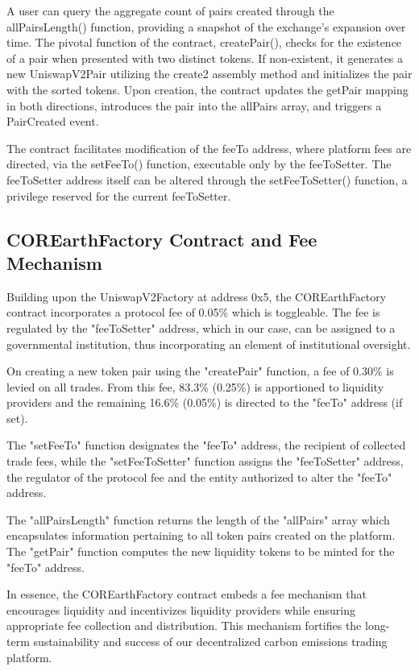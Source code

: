 \documentclass[sigconf, authordraft]{acmart}
\begin{document}
	A user can query the aggregate count of pairs created through the
	allPairsLength() function, providing a snapshot of the exchange's expansion over
	time. The pivotal function of the contract, createPair(), checks for the
	existence of a pair when presented with two distinct tokens. If non-existent,
	it generates a new UniswapV2Pair utilizing the create2 assembly method and
	initializes the pair with the sorted tokens. Upon creation, the contract
	updates the getPair mapping in both directions, introduces the pair into the allPairs
	array, and triggers a PairCreated event.

	The contract facilitates modification of the feeTo address, where platform fees
	are directed, via the setFeeTo() function, executable only by the feeToSetter.
	The feeToSetter address itself can be altered through the setFeeToSetter()
	function, a privilege reserved for the current feeToSetter.

	\subsection{COREarthFactory Contract and Fee Mechanism}


	Building upon the UniswapV2Factory at address 0x5, the COREarthFactory
	contract incorporates a protocol fee of 0.05\% which is toggleable. The fee is
	regulated by the "feeToSetter" address, which in our case, can be assigned to
	a governmental institution, thus incorporating an element of institutional oversight.

	On creating a new token pair using the "createPair" function, a fee of 0.30\% is
	levied on all trades. From this fee, 83.3\% (0.25\%) is apportioned to liquidity
	providers and the remaining 16.6\% (0.05\%) is directed to the "feeTo" address
	(if set).

	The "setFeeTo" function designates the "feeTo" address, the recipient of
	collected trade fees, while the "setFeeToSetter" function assigns the "feeToSetter"
	address, the regulator of the protocol fee and the entity authorized to alter
	the "feeTo" address.

	The "allPairsLength" function returns the length of the "allPairs" array which
	encapsulates information pertaining to all token pairs created on the platform.
	The "getPair" function computes the new liquidity tokens to be minted for the "feeTo"
	address.

	In essence, the COREarthFactory contract embeds a fee mechanism that
	encourages liquidity and incentivizes liquidity providers while ensuring
	appropriate fee collection and distribution. This mechanism fortifies the long-term
	sustainability and success of our decentralized carbon emissions trading platform.
\end{document}
